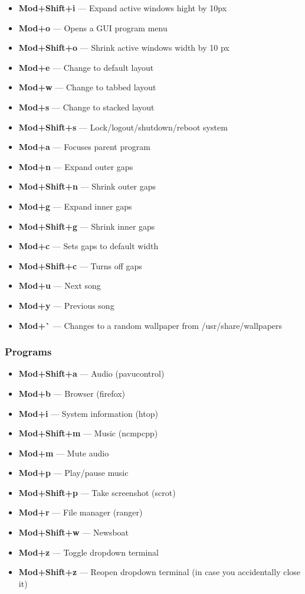 \documentclass{article}
\begin{document}
\begin{itemize}
	\item \textbf{Mod+Shift+i} --- Expand active windows hight by 10px
	\item \textbf{Mod+o} --- Opens a GUI program menu
	\item \textbf{Mod+Shift+o} --- Shrink active windows width by 10 px
	\item \textbf{Mod+e} --- Change to default layout
	\item \textbf{Mod+w} --- Change to tabbed layout
	\item \textbf{Mod+s} --- Change to stacked layout
	\item \textbf{Mod+Shift+s} --- Lock/logout/shutdown/reboot system
	\item \textbf{Mod+a} --- Focuses parent program
	\item \textbf{Mod+n} --- Expand outer gaps
	\item \textbf{Mod+Shift+n} --- Shrink outer gaps
	\item \textbf{Mod+g} --- Expand inner gaps
	\item \textbf{Mod+Shift+g} --- Shrink inner gaps
	\item \textbf{Mod+c} --- Sets gaps to default width
	\item \textbf{Mod+Shift+c} --- Turns off gaps
	\item \textbf{Mod+u} --- Next song
	\item \textbf{Mod+y} --- Previous song
	\item \textbf{Mod+\`} --- Changes to a random wallpaper from /usr/share/wallpapers
\end{itemize}

\subsubsection{Programs}
\begin{itemize}
	\item \textbf{Mod+Shift+a} --- Audio (pavucontrol)
	\item \textbf{Mod+b} --- Browser (firefox)
	\item \textbf{Mod+i} --- System information (htop)
	\item \textbf{Mod+Shift+m} --- Music (ncmpcpp)
	\item \textbf{Mod+m} --- Mute audio
	\item \textbf{Mod+p} --- Play/pause music
	\item \textbf{Mod+Shift+p} --- Take screenshot (scrot)
	\item \textbf{Mod+r} --- File manager (ranger)
	\item \textbf{Mod+Shift+w} --- Newsboat
	\item \textbf{Mod+z} --- Toggle dropdown terminal
	\item \textbf{Mod+Shift+z} --- Reopen dropdown terminal (in case you accidentally close it)
\end{itemize}
\end{document}
